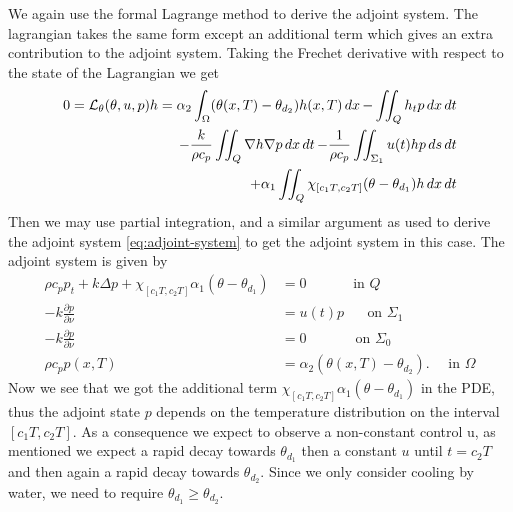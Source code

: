We again use the formal Lagrange method to derive the adjoint system. The lagrangian takes the same form except an additional term which gives an extra contribution to the adjoint system. Taking the Frechet derivative with respect to the state of the Lagrangian we get
\begin{equation}
  \begin{aligned}
  0 = \mathcal{L}_\theta(\theta, u, p)h = \alpha_2 \int_\Omega (\theta(x,T) - \theta_{d_2})h(x, T)\mathop{dx} - \iint_Q h_t p\mathop{dx}\mathop{dt} \\
  - \frac{k}{\rho c_p}\iint_Q\nabla h\nabla p \mathop{dx}\mathop{dt}
  - \frac{1}{\rho c_p}\iint_{\Sigma_1} u(t)h p\mathop{ds}\mathop{dt} \\
  + \alpha_1 \iint_{Q}\chi_{[c_1T,c_2T]}(\theta - \theta_{d_1})h \mathop{dx}\mathop{dt}
  \end{aligned}
\end{equation}
Then we may use partial integration, and a similar argument as used to derive the adjoint system \eqref{eq:adjoint-system} to get the adjoint system in this case. The adjoint system is given by 
\begin{subequations}
   \begin{align*} 
      \rho c_p p_t + k\Delta p + \chi_{[c_1T,c_2T]}\alpha_1(\theta - \theta_{d_1})&= 0 \quad\qquad\textrm{ in } Q  \\
      {-k}\frac{\partial p}{\partial\nu} &= u(t)p \,\,\quad\textrm{ on } \Sigma_1  \\
      {-k}\frac{\partial p}{\partial\nu} &= 0 \,\quad\qquad\textrm{ on } \Sigma_0  \\
      \rho c_p p(x, T) &= \alpha_2(\theta(x, T) - \theta_{d_2}). \quad \textrm{ in } \Omega
   \end{align*}
\end{subequations}
Now we see that we got the additional term $\chi_{[c_1T,c_2T]}\alpha_1(\theta-\theta_{d_1})$ in the PDE, thus the adjoint state $p$ depends on the temperature distribution on the interval $[c_1T,c_2T]$. As a consequence we expect to observe a non-constant control u, as mentioned we expect a rapid decay towards $\theta_{d_1}$ then a constant $u$ until $t=c_2T$ and then again a rapid decay towards $\theta_{d_2}$. Since we only consider cooling by water, we need to require $\theta_{d_1} \geq \theta_{d_2}$.